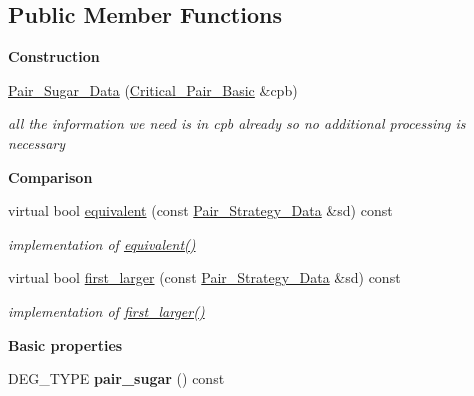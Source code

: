 \subsection*{Public Member Functions}
\begin{Indent}\textbf{ Construction}\par
\begin{DoxyCompactItemize}
\item 
\mbox{\label{class_pair___sugar___data_a2f244064c356cd5c33164adf75177fac}} 
\hyperlink{class_pair___sugar___data_a2f244064c356cd5c33164adf75177fac}{Pair\+\_\+\+Sugar\+\_\+\+Data} (\hyperlink{class_critical___pair___basic}{Critical\+\_\+\+Pair\+\_\+\+Basic} \&cpb)
\begin{DoxyCompactList}\small\item\em all the information we need is in {\ttfamily cpb} already so no additional processing is necessary \end{DoxyCompactList}\end{DoxyCompactItemize}
\end{Indent}
\begin{Indent}\textbf{ Comparison}\par
\begin{DoxyCompactItemize}
\item 
\mbox{\label{class_pair___sugar___data_abd2ef27e308ee646a64b448ad63e941b}} 
virtual bool \hyperlink{class_pair___sugar___data_abd2ef27e308ee646a64b448ad63e941b}{equivalent} (const \hyperlink{class_pair___strategy___data}{Pair\+\_\+\+Strategy\+\_\+\+Data} \&sd) const
\begin{DoxyCompactList}\small\item\em implementation of \hyperlink{class_pair___sugar___data_abd2ef27e308ee646a64b448ad63e941b}{equivalent()} \end{DoxyCompactList}\item 
\mbox{\label{class_pair___sugar___data_aa898723612943072f6b83eaaa58b70ce}} 
virtual bool \hyperlink{class_pair___sugar___data_aa898723612943072f6b83eaaa58b70ce}{first\+\_\+larger} (const \hyperlink{class_pair___strategy___data}{Pair\+\_\+\+Strategy\+\_\+\+Data} \&sd) const
\begin{DoxyCompactList}\small\item\em implementation of \hyperlink{class_pair___sugar___data_aa898723612943072f6b83eaaa58b70ce}{first\+\_\+larger()} \end{DoxyCompactList}\end{DoxyCompactItemize}
\end{Indent}
\begin{Indent}\textbf{ Basic properties}\par
\begin{DoxyCompactItemize}
\item 
\mbox{\label{class_pair___sugar___data_af2fddc7e7baf0b270ce9789e4dee5290}} 
D\+E\+G\+\_\+\+T\+Y\+PE {\bfseries pair\+\_\+sugar} () const
\end{DoxyCompactItemize}
\end{Indent}
